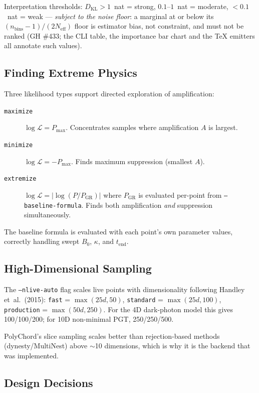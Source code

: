 Interpretation thresholds: $D_\mathrm{KL} > 1$~nat = strong,
$0.1$--$1$~nat = moderate, $< 0.1$~nat = weak --- \emph{subject to the
noise floor}: a marginal at or below its
$(n_\mathrm{bins}-1)/(2N_\mathrm{eff})$ floor is estimator bias, not
constraint, and must not be ranked (GH \#433; the CLI table, the
importance bar chart and the TeX emitters all annotate such values).

\subsection{Finding Extreme Physics}
\label{sec:inference-extremize}

Three likelihood types support directed exploration of amplification:

\begin{description}
  \item[\texttt{maximize}] $\log\mathcal{L} = P_\mathrm{max}$.
    Concentrates samples where amplification $A$ is largest.
  \item[\texttt{minimize}] $\log\mathcal{L} = -P_\mathrm{max}$.
    Finds maximum suppression (smallest $A$).
  \item[\texttt{extremize}] $\log\mathcal{L} = |\log(P / P_\mathrm{GR})|$
    where $P_\mathrm{GR}$ is evaluated per-point from
    \texttt{--baseline-formula}.  Finds both amplification \emph{and}
    suppression simultaneously.
\end{description}

The baseline formula is evaluated with each point's own parameter values,
correctly handling swept $B_0$, $\kappa$, and $t_\mathrm{end}$.

\subsection{High-Dimensional Sampling}
\label{sec:inference-highdim}

The \texttt{--nlive-auto} flag scales live points with dimensionality
following Handley et~al.\ (2015): \texttt{fast} = $\max(25d, 50)$,
\texttt{standard} = $\max(25d, 100)$, \texttt{production} =
$\max(50d, 250)$.  For the 4D dark-photon model this gives 100/100/200;
for 10D non-minimal PGT, 250/250/500.

PolyChord's slice sampling scales better than rejection-based methods
(dynesty/MultiNest) above $\sim$10 dimensions, which is why it is the backend
that was implemented.

\subsection{Design Decisions}
\label{sec:inference-design}

